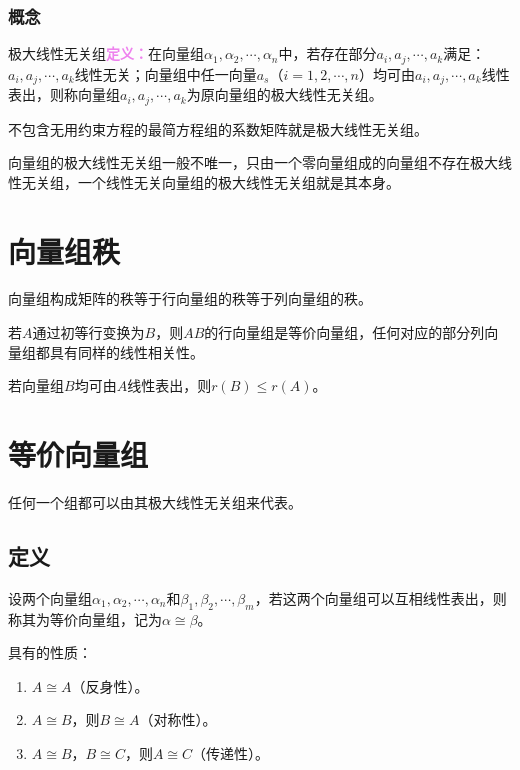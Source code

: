\subsubsection{概念}

极大线性无关组\textcolor{violet}{\textbf{定义：}}在向量组$\alpha_1,\alpha_2,\cdots,\alpha_n$中，若存在部分$a_i,a_j,\cdots,a_k$满足：$a_i,a_j,\cdots,a_k$线性无关；向量组中任一向量$a_s$（$i=1,2,\cdots,n$）均可由$a_i,a_j,\cdots,a_k$线性表出，则称向量组$a_i,a_j,\cdots,a_k$为原向量组的极大线性无关组。

不包含无用约束方程的最简方程组的系数矩阵就是极大线性无关组。

向量组的极大线性无关组一般不唯一，只由一个零向量组成的向量组不存在极大线性无关组，一个线性无关向量组的极大线性无关组就是其本身。

\section{向量组秩}

向量组构成矩阵的秩等于行向量组的秩等于列向量组的秩。

若$A$通过初等行变换为$B$，则$AB$的行向量组是等价向量组，任何对应的部分列向量组都具有同样的线性相关性。

若向量组$B$均可由$A$线性表出，则$r(B)\leqslant r(A)$。

\section{等价向量组}

任何一个组都可以由其极大线性无关组来代表。

\subsection{定义}

设两个向量组$\alpha_1,\alpha_2,\cdots,\alpha_n$和$\beta_1,\beta_2,\cdots,\beta_m$，若这两个向量组可以互相线性表出，则称其为等价向量组，记为$\alpha\cong\beta$。

具有的性质：

\begin{enumerate}
    \item $A\cong A$（反身性）。
    \item $A\cong B$，则$B\cong A$（对称性）。
    \item $A\cong B$，$B\cong C$，则$A\cong C$（传递性）。
\end{enumerate}


